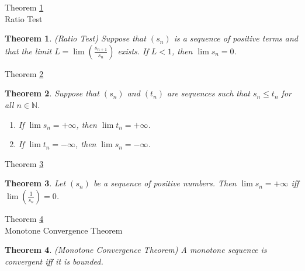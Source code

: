 \documentclass[avery5371,grid]{flashcards}
\newtheorem{theorem}{Theorem}
\newcommand{\bb}[1]{\mathbb{#1}}
\newcommand{\N}{\bb{N}}
\begin{document}
\begin{flashcard}[Theorem]{Theorem \ref{thm55}\\
Ratio Test}
\begin{theorem}
\label{thm55}
(Ratio Test)  Suppose that $(s_n)$ is a sequence of positive terms and
that the limit $L = \lim \left( \frac{s_{n+1}}{s_n} \right)$ exists.
If $L < 1$, then $\lim s_n = 0$.
\end{theorem}
\end{flashcard}

\begin{flashcard}[Theorem]{Theorem \ref{thm56}}
\begin{theorem}
\label{thm56}
Suppose that $(s_n)$ and $(t_n)$ are sequences such that $s_n \leq t_n$
for all $n \in \N$.  
\begin{enumerate}
\item If $\lim s_n = + \infty$, then $\lim t_n = + \infty$.
\item If $\lim t_n = - \infty$, then $\lim s_n = - \infty$.
\end{enumerate}
\end{theorem}
\end{flashcard}

\begin{flashcard}[Theorem]{Theorem \ref{thm57}}
\begin{theorem}
\label{thm57}
Let $(s_n)$ be a sequence of positive numbers.  Then $\lim s_n = + \infty$
iff $\lim \left( \frac{1}{s_n} \right) = 0$.
\end{theorem}
\end{flashcard}

\begin{flashcard}[Theorem]{Theorem \ref{thm58} \\ Monotone Convergence
Theorem}
\begin{theorem}
\label{thm58}
(Monotone Convergence Theorem)  A monotone sequence is convergent iff it
is bounded.
\end{theorem}
\end{flashcard}
\end{document}
